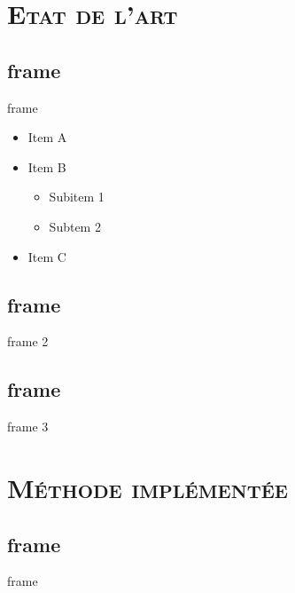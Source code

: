 \documentclass[xcolor=x11names,compress]{beamer}
\renewcommand{\(}{\begin{columns}} \renewcommand{\)}{\end{columns}}
\newcommand{\<}[1]{\begin{column}{#1}} \renewcommand{\>}{\end{column}}
\begin{document}
\section{\scshape Etat de l'art}
\subsection{frame}
\begin{frame}{frame}
\begin{itemize}
\item Item A
\item Item B
\begin{itemize}
\item Subitem 1
\item Subtem 2
\end{itemize}
\item Item C
\end{itemize}
\end{frame}

\subsection{frame}
\begin{frame}{frame 2}

\end{frame}

\subsection{frame}
\begin{frame}{frame 3}

\end{frame}


\section{\scshape Méthode implémentée}
\subsection{frame}
\begin{frame}{frame}

\end{frame}
\end{document}
